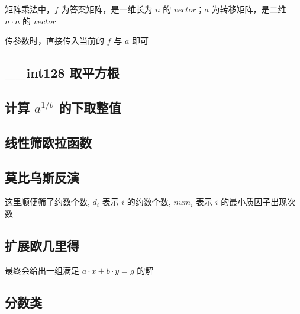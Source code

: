 \documentclass[12pt]{article}
\theoremstyle{definition}
\theoremstyle{remark}
\begin{document}
矩阵乘法中，$f$ 为答案矩阵，是一维长为 $n$ 的 $vector$；$a$ 为转移矩阵，是二维 $n\cdot n$ 的 $vector$

传参数时，直接传入当前的 $f$ 与 $a$ 即可



\newpage

\subsection{\_{}\_{}int128 取平方根}



\newpage

\subsection{计算 $a^{1/b}$ 的下取整值}



\subsection{线性筛欧拉函数}



\subsection{莫比乌斯反演}

这里顺便筛了约数个数, $d_i$ 表示 $i$ 的约数个数, $num_i$ 表示 $i$ 的最小质因子出现次数



\newpage

\subsection{扩展欧几里得}

最终会给出一组满足 $a\cdot x+b\cdot y=g$ 的解



\subsection{分数类}


\end{document}
